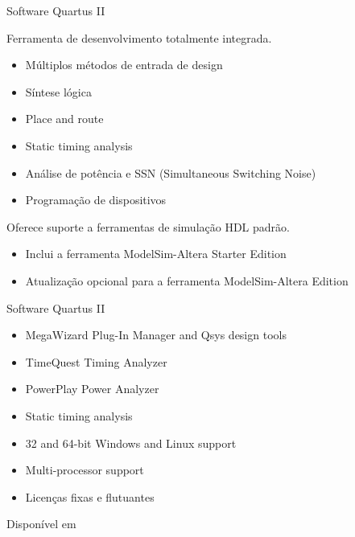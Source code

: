 \documentclass{CPSPresentation}
\begin{document}
\begin{frame}{Software Quartus II}
	\justifying
	
	\begin{block}{}
	\justifying
	Ferramenta de desenvolvimento totalmente integrada.
	
	
		\begin{itemize}
		\item Múltiplos métodos de entrada de design
		\item Síntese lógica
		\item Place and route
		\item Static timing analysis
		\item Análise de potência e SSN (Simultaneous Switching Noise)
		\item Programação de dispositivos
		\end{itemize}
	\end{block}
	
	\begin{alertblock}{}
	Oferece suporte a ferramentas de simulação HDL padrão.
	\begin{itemize}
	\item Inclui a ferramenta ModelSim-Altera Starter Edition
	\item Atualização opcional para a ferramenta ModelSim-Altera Edition
	\end{itemize}

	\end{alertblock}	
	
	
\end{frame}
\begin{frame}{Software Quartus II}
	\justifying
	
	\begin{block}{}
	\justifying	
	\begin{itemize}
		\item MegaWizard Plug-In Manager and Qsys design tools
		\item TimeQuest Timing Analyzer
		\item PowerPlay Power Analyzer
		\item Static timing analysis
		\item 32 and 64-bit Windows and Linux support
		\item Multi-processor support
		\item Licenças fixas e flutuantes
	\end{itemize}
	\end{block}

	
	\begin{alertblock}{}
	Disponível em \href{https://www.intel.com/content/www/us/en/software-kit/666221/intel-quartus-ii-web-edition-design-software-version-13-1-for-windows.html/}{}
	\end{alertblock}	
	
	
\end{frame}
\end{document}
